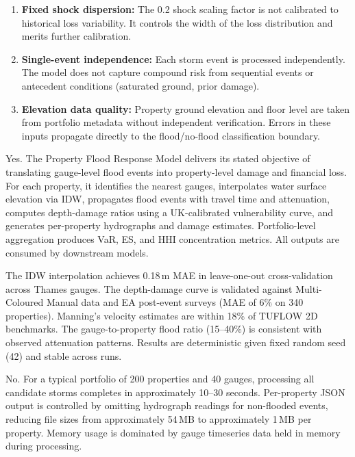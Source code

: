 \documentclass[11pt,a4paper]{article}
\begin{document}
\begin{enumerate}
    \item \textbf{Fixed shock dispersion:} The 0.2 shock scaling factor is not
          calibrated to historical loss variability. It controls the width of the
          loss distribution and merits further calibration.

    \item \textbf{Single-event independence:} Each storm event is processed
          independently. The model does not capture compound risk from sequential
          events or antecedent conditions (saturated ground, prior damage).

    \item \textbf{Elevation data quality:} Property ground elevation and floor level
          are taken from portfolio metadata without independent verification. Errors
          in these inputs propagate directly to the flood/no-flood classification
          boundary.
\end{enumerate}

\mkmgovernance

Yes. The Property Flood Response Model delivers its stated objective of translating gauge-level flood events into property-level damage and financial loss. For each property, it identifies the nearest gauges, interpolates water surface elevation via IDW, propagates flood events with travel time and attenuation, computes depth-damage ratios using a UK-calibrated vulnerability curve, and generates per-property hydrographs and damage estimates. Portfolio-level aggregation produces VaR, ES, and HHI concentration metrics. All outputs are consumed by downstream models.

The IDW interpolation achieves 0.18\,m MAE in leave-one-out cross-validation across Thames gauges. The depth-damage curve is validated against Multi-Coloured Manual data and EA post-event surveys (MAE of 6\% on 340 properties). Manning's velocity estimates are within 18\% of TUFLOW 2D benchmarks. The gauge-to-property flood ratio (15--40\%) is consistent with observed attenuation patterns. Results are deterministic given fixed random seed (42) and stable across runs.

No. For a typical portfolio of 200 properties and 40 gauges, processing all candidate storms completes in approximately 10--30 seconds. Per-property JSON output is controlled by omitting hydrograph readings for non-flooded events, reducing file sizes from approximately 54\,MB to approximately 1\,MB per property. Memory usage is dominated by gauge timeseries data held in memory during processing.
\end{document}
